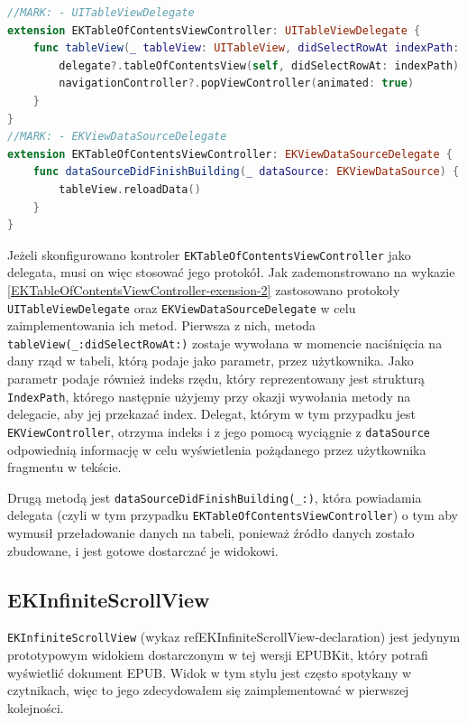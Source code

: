 \begin{lstlisting}[language=swift,caption={Rozszerzenie klasy \texttt{EKTableOfContentsViewController} o protokoły \texttt{UITableViewDelegate} oraz \texttt{EKViewDataSourceDelegate}},label=EKTableOfContentsViewController-exension-2]
//MARK: - UITableViewDelegate
extension EKTableOfContentsViewController: UITableViewDelegate {
    func tableView(_ tableView: UITableView, didSelectRowAt indexPath: IndexPath) {
        delegate?.tableOfContentsView(self, didSelectRowAt: indexPath)
        navigationController?.popViewController(animated: true)
    }
}
//MARK: - EKViewDataSourceDelegate
extension EKTableOfContentsViewController: EKViewDataSourceDelegate {
    func dataSourceDidFinishBuilding(_ dataSource: EKViewDataSource) {
        tableView.reloadData()
    }
}
\end{lstlisting}

Jeżeli skonfigurowano kontroler \texttt{EKTableOfContentsViewController} jako delegata, musi on więc stosować jego protokół. Jak zademonstrowano na wykazie \ref{EKTableOfContentsViewController-exension-2} zastosowano protokoły \texttt{UITableViewDelegate} oraz \texttt{EKViewDataSourceDelegate} w celu zaimplementowania ich metod. Pierwsza z nich, metoda \texttt{tableView(\_:didSelectRowAt:)} zostaje wywołana w momencie naciśnięcia na dany rząd w tabeli, którą podaje jako parametr, przez użytkownika. Jako parametr podaje również indeks rzędu, który reprezentowany jest strukturą \texttt{IndexPath}, którego następnie użyjemy przy okazji wywołania metody na delegacie, aby jej przekazać index. Delegat, którym w tym przypadku jest \texttt{EKViewController}, otrzyma indeks i z jego pomocą wyciągnie z \texttt{dataSource} odpowiednią informację w celu wyświetlenia pożądanego przez użytkownika fragmentu w tekście.

Drugą metodą jest \texttt{dataSourceDidFinishBuilding(\_:)}, która powiadamia delegata (czyli w tym przypadku \texttt{EKTableOfContentsViewController}) o tym aby wymusił przeładowanie danych na tabeli, ponieważ źródło danych zostało zbudowane, i jest gotowe dostarczać je widokowi.

\subsection{EKInfiniteScrollView}

\texttt{EKInfiniteScrollView} (wykaz ref{EKInfiniteScrollView-declaration}) jest jedynym prototypowym widokiem dostarczonym w tej wersji EPUBKit, który potrafi wyświetlić dokument EPUB. Widok w tym stylu jest często spotykany w czytnikach, więc to jego zdecydowałem się zaimplementować w pierwszej kolejności.

